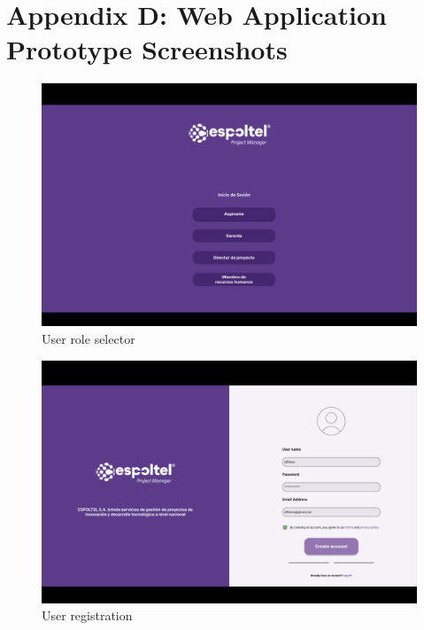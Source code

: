 \documentclass{scrreprt}
\begin{document}
\section{Appendix D: Web Application Prototype Screenshots}

\begin{figure}[H]
    
    \centering \small
    \includegraphics[width=1\textwidth]{WebPrototype/Mainpage.png}
    \caption{User role selector }
\end{figure}


\begin{figure} [H]
    
    \centering \small
    \includegraphics[width=1\textwidth]{WebPrototype/Registerpage.png}
    \caption{User registration }
\end{figure}
\end{document}
